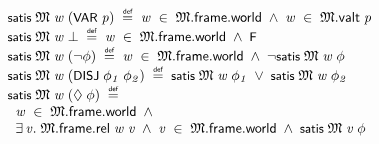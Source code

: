 \documentclass[letterpaper]{article}
\renewcommand{\HOLConst}[1]{{\textsf{\upshape\small #1}}}
\newenvironment{holmath}{\begin{displaymath}\begin{array}{l}}{\end{array}\end{displaymath}\ignorespacesafterend}
\begin{document}
\begin{holmath}
  \HOLConst{satis}\;\HOLFreeVar{\ensuremath{\mathfrak{M}}}\;\HOLFreeVar{w}\;(\HOLConst{VAR}\;\HOLFreeVar{p})\;\HOLSymConst{\HOLTokenDefEquality{}}\;\HOLFreeVar{w}\;\HOLSymConst{\HOLTokenIn{}}\;\HOLFreeVar{\ensuremath{\mathfrak{M}}}.\HOLFieldName{frame}.\HOLFieldName{world}\;\HOLSymConst{\HOLTokenConj{}}\;\HOLFreeVar{w}\;\HOLSymConst{\HOLTokenIn{}}\;\HOLFreeVar{\ensuremath{\mathfrak{M}}}.\HOLFieldName{valt}\;\HOLFreeVar{p}\\
\HOLConst{satis}\;\HOLFreeVar{\ensuremath{\mathfrak{M}}}\;\HOLFreeVar{w}\;\HOLSymConst{\ensuremath{\bot}}\;\HOLSymConst{\HOLTokenDefEquality{}}\;\HOLFreeVar{w}\;\HOLSymConst{\HOLTokenIn{}}\;\HOLFreeVar{\ensuremath{\mathfrak{M}}}.\HOLFieldName{frame}.\HOLFieldName{world}\;\HOLSymConst{\HOLTokenConj{}}\;\HOLConst{F}\\
\HOLConst{satis}\;\HOLFreeVar{\ensuremath{\mathfrak{M}}}\;\HOLFreeVar{w}\;(\HOLSymConst{\HOLTokenNeg{}}\HOLFreeVar{\ensuremath{\phi}})\;\HOLSymConst{\HOLTokenDefEquality{}}\;\HOLFreeVar{w}\;\HOLSymConst{\HOLTokenIn{}}\;\HOLFreeVar{\ensuremath{\mathfrak{M}}}.\HOLFieldName{frame}.\HOLFieldName{world}\;\HOLSymConst{\HOLTokenConj{}}\;\HOLSymConst{\HOLTokenNeg{}}\HOLConst{satis}\;\HOLFreeVar{\ensuremath{\mathfrak{M}}}\;\HOLFreeVar{w}\;\HOLFreeVar{\ensuremath{\phi}}\\
\HOLConst{satis}\;\HOLFreeVar{\ensuremath{\mathfrak{M}}}\;\HOLFreeVar{w}\;(\HOLConst{DISJ}\;\HOLFreeVar{\ensuremath{\phi\sb{1}}}\;\HOLFreeVar{\ensuremath{\phi\sb{2}}})\;\HOLSymConst{\HOLTokenDefEquality{}}\;\HOLConst{satis}\;\HOLFreeVar{\ensuremath{\mathfrak{M}}}\;\HOLFreeVar{w}\;\HOLFreeVar{\ensuremath{\phi\sb{1}}}\;\HOLSymConst{\HOLTokenDisj{}}\;\HOLConst{satis}\;\HOLFreeVar{\ensuremath{\mathfrak{M}}}\;\HOLFreeVar{w}\;\HOLFreeVar{\ensuremath{\phi\sb{2}}}\\
\HOLConst{satis}\;\HOLFreeVar{\ensuremath{\mathfrak{M}}}\;\HOLFreeVar{w}\;(\HOLSymConst{\ensuremath{\Diamond}}\;\HOLFreeVar{\ensuremath{\phi}})\;\HOLSymConst{\HOLTokenDefEquality{}}\\
\;\;\HOLFreeVar{w}\;\HOLSymConst{\HOLTokenIn{}}\;\HOLFreeVar{\ensuremath{\mathfrak{M}}}.\HOLFieldName{frame}.\HOLFieldName{world}\;\HOLSymConst{\HOLTokenConj{}}\\
\;\;\HOLSymConst{\HOLTokenExists{}}\HOLBoundVar{v}.\;\HOLFreeVar{\ensuremath{\mathfrak{M}}}.\HOLFieldName{frame}.\HOLFieldName{rel}\;\HOLFreeVar{w}\;\HOLBoundVar{v}\;\HOLSymConst{\HOLTokenConj{}}\;\HOLBoundVar{v}\;\HOLSymConst{\HOLTokenIn{}}\;\HOLFreeVar{\ensuremath{\mathfrak{M}}}.\HOLFieldName{frame}.\HOLFieldName{world}\;\HOLSymConst{\HOLTokenConj{}}\;\HOLConst{satis}\;\HOLFreeVar{\ensuremath{\mathfrak{M}}}\;\HOLBoundVar{v}\;\HOLFreeVar{\ensuremath{\phi}}
\end{holmath}
\end{document}
